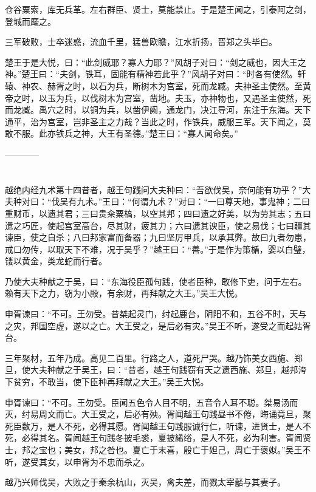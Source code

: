 \documentclass[12pt,UTF8]{ctexbook}
\begin{document}
仓谷粟索，库无兵革。左右群臣、贤士，莫能禁止。于是楚王闻之，引泰阿之剑，登城而麾之。

三军破败，士卒迷惑，流血千里，猛兽欧瞻，江水折扬，晋郑之头毕白。

楚王于是大悦，曰：“此剑威耶？寡人力耶？”风胡子对曰：“剑之威也，因大王之神。”楚王曰：“夫剑，铁耳，固能有精神若此乎？”风胡子对曰：“时各有使然。轩辕、神农、赫胥之时，以石为兵，断树木为宫室，死而龙臧。夫神圣主使然。至黄帝之时，以玉为兵，以伐树木为宫室，凿地。夫玉，亦神物也，又遇圣主使然，死而龙臧。禹穴之时，以铜为兵，以凿伊阙，通龙门，决江导河，东注于东海。天下通平，治为宫室，岂非圣主之力哉？当此之时，作铁兵，威服三军。天下闻之，莫敢不服。此亦铁兵之神，大王有圣德。”楚王曰：“寡人闻命矣。”


------------

\part{}

越绝内经九术第十四昔者，越王句践问大夫种曰：“吾欲伐吴，奈何能有功乎？”大夫种对曰：“伐吴有九术。”王曰：“何谓九术？”对曰：“一曰尊天地，事鬼神；二曰重财币，以遗其君；三曰贵籴粟槁，以空其邦；四曰遗之好美，以为劳其志；五曰遗之巧匠，使起宫室高台，尽其财，疲其力；六曰遗其谀臣，使之易伐；七曰疆其谏臣，使之自杀；八曰邦家富而备器；九曰坚厉甲兵，以承其弊。故曰九者勿患，戒口勿传，以取天下不难，况于吴乎？”越王曰：“善。”于是作为策楯，婴以白璧，镂以黄金，类龙蛇而行者。

乃使大夫种献之于吴，曰：“东海役臣孤句践，使者臣种，敢修下吏，问于左右。赖有天下之力，窃为小殿，有余财，再拜献之大王。”吴王大悦。

申胥谏曰：“不可。王勿受。昔桀起灵门，纣起鹿台，阴阳不和，五谷不时，天与之灾，邦国空虚，遂以之亡。大王受之，是后必有灾。”吴王不听，遂受之而起姑胥台。

三年聚材，五年乃成。高见二百里。行路之人，道死尸哭。越乃饰美女西施、郑旦，使大夫种献之于吴王，曰：“昔者，越王句践窃有天之遗西施、郑旦，越邦洿下贫穷，不敢当，使下臣种再拜献之大王。”吴王大悦。

申胥谏曰：“不可。王勿受。臣闻五色令人目不明，五音令人耳不聪。桀易汤而灭，纣易周文而亡。大王受之，后必有殃。胥闻越王句践昼书不倦，晦诵竟旦，聚死臣数万，是人不死，必得其愿。胥闻越王句践服诚行仁，听谏，进贤士，是人不死，必得其名。胥闻越王句践冬披毛裘，夏披絺绤，是人不死，必为利害。胥闻贤士，邦之宝也；美女，邦之咎也。夏亡于末喜，殷亡于妲己，周亡于褒姒。”吴王不听，遂受其女，以申胥为不忠而杀之。

越乃兴师伐吴，大败之于秦余杭山，灭吴，禽夫差，而戮太宰嚭与其妻子。
\end{document}
